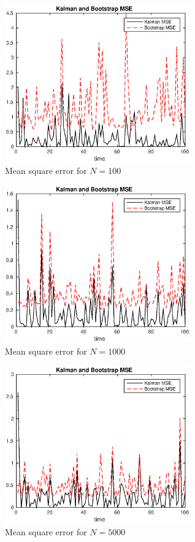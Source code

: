 \documentclass[11pt, english]{article}
\begin{document}
\begin{figure}[h]
  
  \centering
    \includegraphics[width=80mm]{./kfigs/002_n100MSE.eps}
    \caption{Mean square error for $N=100$}
    \label{k1}
\end{figure}

\begin{figure}[h]
  
  \centering
    \includegraphics[width=80mm]{./kfigs/003_n1000MSE.eps}
    \caption{Mean square error for $N=1000$}
    \label{k2}
\end{figure}

\begin{figure}[h]
  
  \centering
    \includegraphics[width=80mm]{./kfigs/004_n5000MSE.eps}
    \caption{Mean square error for $N=5000$}
    \label{k3}
\end{figure}
\end{document}
